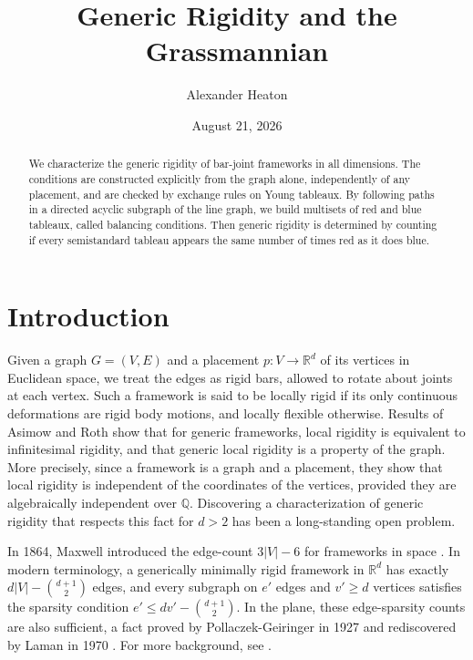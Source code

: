 \documentclass[11pt,letterpaper]{amsart}
\title{Generic Rigidity and the Grassmannian}
\author{Alexander Heaton}
\date{August 21, 2026}
\theoremstyle{definition}
\begin{document}
\begin{abstract}
We characterize the generic rigidity of bar-joint frameworks in all dimensions. The conditions are constructed explicitly from the graph alone, independently of any placement, and are checked by exchange rules on Young tableaux. By following paths in a directed acyclic subgraph of the line graph, we build multisets of red and blue tableaux, called balancing conditions. Then generic rigidity is determined by counting if every semistandard tableau appears the same number of times red as it does blue.
\end{abstract}

\maketitle



\section{Introduction}\label{sec:introduction}

Given a graph $G = (V,E)$ and a placement $p:V \to \mathbb{R}^d$ of its vertices in Euclidean space, we treat the edges as rigid bars, allowed to rotate about joints at each vertex. Such a framework is said to be locally rigid if its only continuous deformations are rigid body motions, and locally flexible otherwise. 
Results of Asimow and Roth \cite{asimow-roth-I, asimow-roth-II} show that for generic frameworks, local rigidity is equivalent to infinitesimal rigidity, and that generic local rigidity is a property of the graph. More precisely, since a framework is a graph and a placement, they show that local rigidity is independent of the coordinates of the vertices, provided they are algebraically independent over $\mathbb{Q}$.
Discovering a characterization of generic rigidity that respects this fact for $d > 2$ has been a long-standing open problem.

In 1864, Maxwell introduced the edge-count $3|V| - 6$ for frameworks in space \cite{maxwell}. \color{black} In modern terminology, a generically minimally rigid framework in $\mathbb{R}^d$ has exactly $d|V| - \binom{d+1}{2}$ edges, and every subgraph on $e'$ edges and $v' \geq d$ vertices satisfies the sparsity condition $e' \leq dv' - \binom{d+1}{2}$. In the plane, these edge-sparsity counts are also sufficient, a fact proved by Pollaczek-Geiringer in 1927 \cite{Pollaczek-Geiringer1} and rediscovered by Laman in 1970 \cite{laman}. For more background, see \cite{connelly1993rigidity, connelly2021frameworks, cruickshank2025rigidity, rigidity-textbook, Izmestiev2019, schulze2017rigidity, whiteley1996matroids}.
\end{document}

